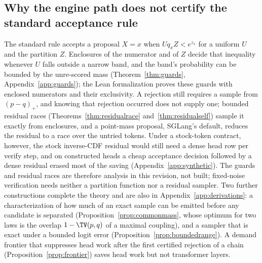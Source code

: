 \subsection{Why the engine path does not certify the standard acceptance rule}\label{sec:standard-rule}
The standard rule accepts a proposal $X=x$ when $Uq_xZ<e^{z_x}$ for a uniform $U$ and the partition $Z$. Enclosures of the numerator and of $Z$ decide that inequality whenever $U$ falls outside a narrow band, and the band's probability can be bounded by the unre-scored mass (Theorem~\ref{thm:guards}, Appendix~\ref{app:guards}); the Lean formalization proves these guards with enclosed numerators and their exclusivity. A rejection still requires a sample from $(p-q)_+$, and knowing that rejection occurred does not supply one; bounded residual races (Theorems~\ref{thm:residualrace} and~\ref{thm:residualself}) sample it exactly from enclosures, and a point-mass proposal, SGLang's default, reduces the residual to a race over the untried tokens. Under a stock-token contract, however, the stock inverse-CDF residual would still need a dense head row per verify step, and on constructed heads a cheap acceptance decision followed by a dense residual erased most of the saving (Appendix~\ref{app:synthetic}). The guards and residual races are therefore analysis in this revision, not built; fixed-noise verification needs neither a partition function nor a residual sampler. Two further constructions complete the theory and are also in Appendix~\ref{app:derivations}: a characterization of how much of an exact sample can be emitted before any candidate is separated (Proposition~\ref{prop:commonmass}, whose optimum for two laws is the overlap $1-\TV(p,q)$ of a maximal coupling), and a sampler that is exact under a bounded logit error (Proposition~\ref{prop:boundedrange}). A demand frontier that suppresses head work after the first certified rejection of a chain (Proposition~\ref{prop:frontier}) saves head work but not transformer layers.

